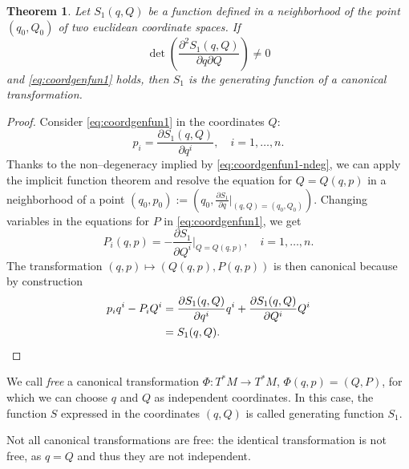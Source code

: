 \documentclass[english,fontsize=11pt,paper=a5,oneside]{scrbook}
\let\d\relax
\DeclareMathOperator{\d}{d}
\newtheorem{theorem}{Theorem}[chapter]
\theoremstyle{definition}
\newenvironment{remark}
  {\pushQED{\qed}\renewcommand{\qedsymbol}{$\lozenge$}\remarkx}
  {\popQED\endremarkx}
\begin{document}
\begin{theorem}\label{thm:S1}
    Let $S_1(q,Q)$ be a function defined in a neighborhood of the point $(q_0, Q_0)$ of two euclidean coordinate spaces. If
    \begin{equation}\label{eq:coordgenfun1-ndeg}
        \det\left( \frac{\partial^2 S_1(q,Q)}{\partial q \partial Q} \right)\neq 0
    \end{equation}
    and \eqref{eq:coordgenfun1} holds, then $S_1$ is the generating function of a canonical transformation.
\end{theorem}
\begin{proof}
    Consider \eqref{eq:coordgenfun1} in the coordinates $Q$:
    \begin{equation}
        p_i = \frac{\partial S_1(q,Q)}{\partial q^i}, \quad i = 1,\ldots, n.
    \end{equation}
    Thanks to the non--degeneracy implied by \eqref{eq:coordgenfun1-ndeg}, we can apply the implicit function theorem and resolve the equation for $Q = Q(q,p)$ in a neighborhood of a point $(q_0, p_0) := \left(q_0, \frac{\partial S_1}{\partial q}\Big|_{(q,Q) =(q_0, Q_0)}\right)$.
    Changing variables in the equations for $P$ in \eqref{eq:coordgenfun1}, we get
    \begin{equation}
        P_i(q,p) = -\frac{\partial S_1}{\partial Q^i}\Big|_{Q=Q(q,p)},\quad i=1,\ldots,n.
    \end{equation}
    The transformation $(q,p) \mapsto (Q(q,p), P(q,p))$ is then canonical because by construction
    \begin{align}
        p_i \d q^i - P_i \d Q^i &= \frac{\partial S_1(q,Q)}{\partial q^i}\d q^i + \frac{\partial S_1(q,Q)}{\partial Q^i}\d Q^i \\
        &= \d S_1(q,Q).
    \end{align}
\end{proof}

\begin{tcolorbox}
    We call \emph{free} a canonical transformation $\Phi:T^*M\to T^* M$, $\Phi(q,p) = (Q,P)$, for which we can choose $q$ and $Q$ as independent coordinates.
    In this case, the function $S$ expressed in the coordinates $(q,Q)$ is called generating function $S_1$.
\end{tcolorbox}

\begin{remark}
    Not all canonical transformations are free: the identical transformation is not free, as $q=Q$ and thus they are not independent.
\end{remark}
\end{document}
